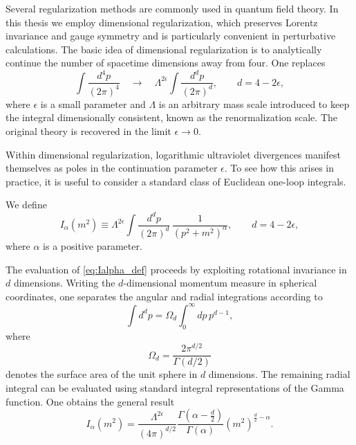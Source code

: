 Several regularization methods are commonly used in quantum field theory.
In this thesis we employ dimensional regularization, which preserves
Lorentz invariance and gauge symmetry and is particularly convenient in 
perturbative calculations. The basic idea of dimensional regularization
is to analytically continue the number of spacetime dimensions away from
four. One replaces
\begin{equation}
\int \frac{d^4 p}{(2\pi)^4}
\quad \longrightarrow \quad
\Lambda^{2\epsilon}
\int \frac{d^{d} p}{(2\pi)^{d}},
\qquad
d = 4 - 2\epsilon ,
\end{equation}
where $\epsilon$ is a small parameter and $\Lambda$ is an arbitrary mass
scale introduced to keep the integral dimensionally consistent,
known as the renormalization scale.
The original theory is recovered in the limit $\epsilon \to 0$.

Within dimensional regularization, logarithmic ultraviolet divergences manifest
themselves as poles in the continuation parameter $\epsilon$.
To see how this arises in practice, it is useful to consider a
standard class of Euclidean one-loop integrals.

We define
\begin{equation}
I_\alpha(m^2)
\equiv
\Lambda^{2\epsilon}
\int \frac{d^{d}p}{(2\pi)^{d}}\,
\frac{1}{(p^2+m^2)^\alpha},
\qquad d=4-2\epsilon ,
\label{eq:Ialpha_def}
\end{equation}
where $\alpha$ is a positive parameter.

The evaluation of \eqref{eq:Ialpha_def} proceeds by exploiting
rotational invariance in $d$ dimensions.
Writing the $d$-dimensional momentum measure in spherical coordinates,
one separates the angular and radial integrations according to
\begin{equation}
\int d^d p
=
\Omega_d
\int_0^\infty dp\, p^{d-1},
\end{equation}
where
\begin{equation}
\Omega_d = \frac{2\pi^{d/2}}{\Gamma(d/2)}
\end{equation}
denotes the surface area of the unit sphere in $d$ dimensions.
The remaining radial integral can be evaluated using standard integral
representations of the Gamma function.
One obtains the general result
\cite{PeskinSchroeder1995,WeinbergQFT}
\begin{equation}
I_\alpha(m^2)
=
\frac{\Lambda^{2\epsilon}}{(4\pi)^{d/2}}
\frac{\Gamma\!\left(\alpha-\frac{d}{2}\right)}{\Gamma(\alpha)}
\left(m^2\right)^{\frac{d}{2}-\alpha}.
\label{eq:Ialpha_gamma}
\end{equation}


